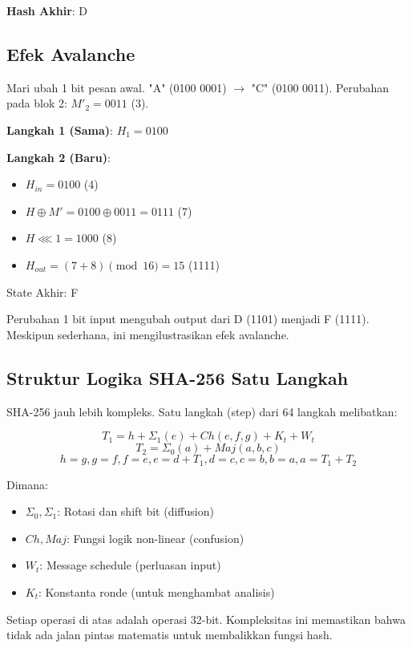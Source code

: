 \textbf{Hash Akhir}: D

\subsection{Efek Avalanche}

Mari ubah 1 bit pesan awal. "A" (0100 0001) $\rightarrow$ "C" (0100 0011).
Perubahan pada blok 2: $M'_2 = 0011$ (3).

\textbf{Langkah 1 (Sama)}: $H_1 = 0100$

\textbf{Langkah 2 (Baru)}:
\begin{itemize}
  \item $H_{in} = 0100$ (4)
  \item $H \oplus M' = 0100 \oplus 0011 = 0111$ (7)
  \item $H \lll 1 = 1000$ (8)
  \item $H_{out} = (7 + 8) \pmod{16} = 15$ (1111)
\end{itemize}
State Akhir: F

Perubahan 1 bit input mengubah output dari D (1101) menjadi F (1111). Meskipun sederhana, ini mengilustrasikan efek avalanche.

\subsection{Struktur Logika SHA-256 Satu Langkah}

SHA-256 jauh lebih kompleks. Satu langkah (step) dari 64 langkah melibatkan:

\[
T_1 = h + \Sigma_1(e) + Ch(e,f,g) + K_t + W_t
\]
\[
T_2 = \Sigma_0(a) + Maj(a,b,c)
\]
\[
h = g, g = f, f = e, e = d + T_1, d = c, c = b, b = a, a = T_1 + T_2
\]

Dimana:
\begin{itemize}
  \item $\Sigma_0, \Sigma_1$: Rotasi dan shift bit (diffusion)
  \item $Ch, Maj$: Fungsi logik non-linear (confusion)
  \item $W_t$: Message schedule (perluasan input)
  \item $K_t$: Konstanta ronde (untuk menghambat analisis)
\end{itemize}

Setiap operasi di atas adalah operasi 32-bit. Kompleksitas ini memastikan bahwa tidak ada jalan pintas matematis untuk membalikkan fungsi hash.
